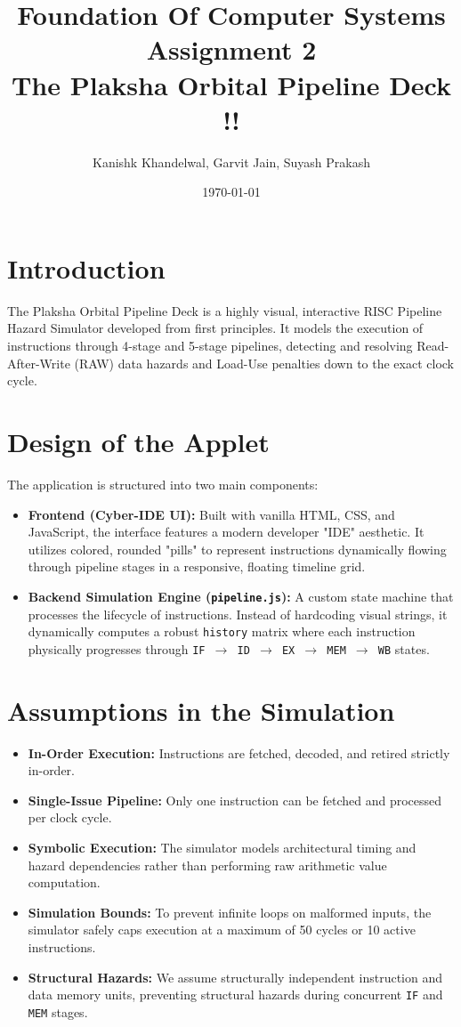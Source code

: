\documentclass[12pt,a4paper]{article}
\title{\textbf{Foundation Of Computer Systems Assignment 2} \\ \Large The Plaksha Orbital Pipeline Deck !!}
\author{Kanishk Khandelwal, Garvit Jain, Suyash Prakash}
\date{\today}
\begin{document}
\maketitle

\section{Introduction}
The Plaksha Orbital Pipeline Deck is a highly visual, interactive RISC Pipeline Hazard Simulator developed from first principles. It models the execution of instructions through 4-stage and 5-stage pipelines, detecting and resolving Read-After-Write (RAW) data hazards and Load-Use penalties down to the exact clock cycle.

\section{Design of the Applet}
The application is structured into two main components:
\begin{itemize}
    \item \textbf{Frontend (Cyber-IDE UI):} Built with vanilla HTML, CSS, and JavaScript, the interface features a modern developer "IDE" aesthetic. It utilizes colored, rounded "pills" to represent instructions dynamically flowing through pipeline stages in a responsive, floating timeline grid.
    \item \textbf{Backend Simulation Engine (\texttt{pipeline.js}):} A custom state machine that processes the lifecycle of instructions. Instead of hardcoding visual strings, it dynamically computes a robust \texttt{history} matrix where each instruction physically progresses through \texttt{IF $\rightarrow$ ID $\rightarrow$ EX $\rightarrow$ MEM $\rightarrow$ WB} states.
\end{itemize}

\section{Assumptions in the Simulation}
\begin{itemize}
    \item \textbf{In-Order Execution:} Instructions are fetched, decoded, and retired strictly in-order.
    \item \textbf{Single-Issue Pipeline:} Only one instruction can be fetched and processed per clock cycle.
    \item \textbf{Symbolic Execution:} The simulator models architectural timing and hazard dependencies rather than performing raw arithmetic value computation.
    \item \textbf{Simulation Bounds:} To prevent infinite loops on malformed inputs, the simulator safely caps execution at a maximum of 50 cycles or 10 active instructions.
    \item \textbf{Structural Hazards:} We assume structurally independent instruction and data memory units, preventing structural hazards during concurrent \texttt{IF} and \texttt{MEM} stages.
\end{itemize}
\end{document}

